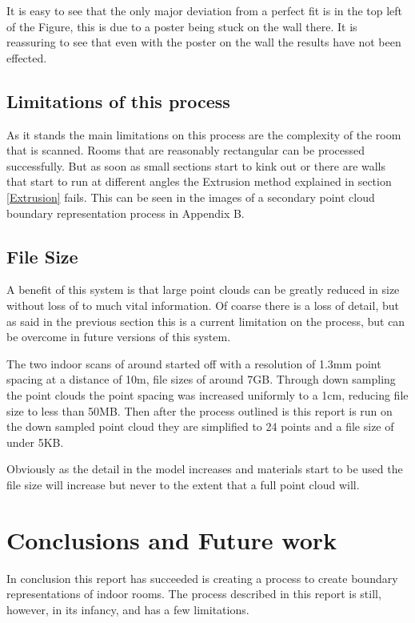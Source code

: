 		It is easy to see that the only major deviation from a perfect fit is in the top left of the Figure, this is due to a poster being stuck on the wall there. It is reassuring to see that even with the poster on the wall the results have not been effected.
	
	\section{Limitations of this process}
	\label{Limitations}
		As it stands the main limitations on this process are the complexity of the room that is scanned. Rooms that are reasonably rectangular can be processed successfully. But as soon as small sections start to kink out or there are walls that start to run at different angles the Extrusion method explained in section \ref{Extrusion} fails. This can be seen in the images of a secondary point cloud boundary representation process in Appendix B.
		
	\section{File Size}
	
		A benefit of this system is that large point clouds can be greatly reduced in size without loss of to much vital information. Of coarse there is a loss of detail, but as said in the previous section this is a current limitation on the process, but can be overcome in future versions of this system.
		
		The two indoor scans of around started off with a resolution of 1.3mm point spacing at a distance of 10m, file sizes of around 7GB. Through down sampling the point clouds the point spacing was increased uniformly to a 1cm, reducing file size to less than 50MB. Then after the process outlined is this report is run on the down sampled point cloud they are simplified to 24 points and a file size of under 5KB.
		
		Obviously as the detail in the model increases and materials start to be used the file size will increase but never to the extent that a full point cloud will. 
		

	
\chapter{Conclusions and Future work}

In conclusion this report has succeeded is creating a process to create boundary representations of indoor rooms. The process described in this report is still, however, in its infancy, and has a few limitations.



